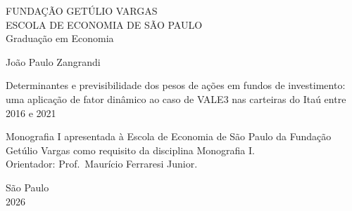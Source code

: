\documentclass[12pt,a4paper]{article}
\begin{document}
\thispagestyle{empty}
\begin{center}
{\large FUNDAÇÃO GETÚLIO VARGAS}\\[2pt]
{\large ESCOLA DE ECONOMIA DE SÃO PAULO}\\[16pt]
{\normalsize Graduação em Economia}

\vspace{3.5cm}

{\large João Paulo Zangrandi}

\vspace{2.5cm}

{\Large Determinantes e previsibilidade dos pesos de ações em fundos de investimento:}\\[12pt]
{\large uma aplicação de fator dinâmico ao caso de VALE3 nas carteiras do Itaú entre 2016 e 2021}

\vspace{2.5cm}

\begin{flushright}
\begin{minipage}{0.62\textwidth}
\small{}
Monografia I apresentada à Escola de Economia de São Paulo da Fundação Getúlio
Vargas como requisito da disciplina Monografia I.
\\[10pt]
Orientador: Prof.\ Maurício Ferraresi Junior.
\end{minipage}
\end{flushright}

\vfill

{\normalsize São Paulo}\\
{\normalsize 2026}
\end{center}

\newpage
\end{document}
